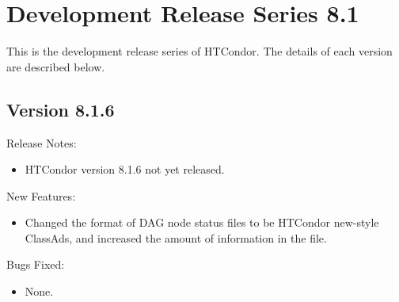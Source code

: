 
\section{\label{sec:History-8-1}Development Release Series 8.1}

This is the development release series of HTCondor.
The details of each version are described below.


\subsection*{\label{sec:New-8-1-6}Version 8.1.6}

\noindent Release Notes:

\begin{itemize}

\item HTCondor version 8.1.6 not yet released.

\end{itemize}


\noindent New Features:

\begin{itemize}

\item Changed the format of DAG node status files to be HTCondor new-style
ClassAds, and increased the amount of information in the file.

\end{itemize}

\noindent Bugs Fixed:

\begin{itemize}

\item None.

\end{itemize}

